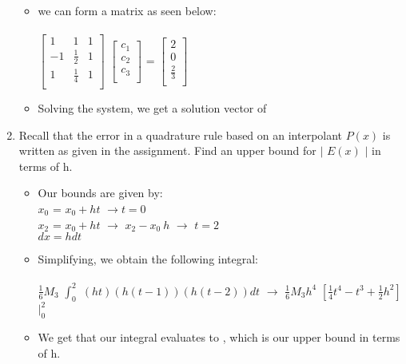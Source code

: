 \documentclass[12pt]{article}
\begin{document}
\begin{enumerate}
\begin{itemize}
		\item we can form a matrix as seen below: \\ \\
		$\begin{bmatrix}
   			1 & 1 & 1 \\
   			-1 & \frac{1}{2} & 1 \\
   			1 & \frac{1}{4} & 1 \\
		\end{bmatrix}$ 	$\begin{bmatrix}
   			c_1  \\
   			c_2  \\
   			c_3  \\
		\end{bmatrix}$ = $\begin{bmatrix}
   			2  \\
   			0  \\
   			\frac{2}{3}  \\
		\end{bmatrix}$
		
		\item Solving the system, we get a solution vector of \\ 
	\end{itemize}
	
	\item Recall that the error in a quadrature rule based on an interpolant $P(x)$ is written as given in the assignment. Find an upper bound for $|$ $E(x)$ $|$ in terms of h.
	\begin{itemize}
		\item Our bounds are given by: \\
		$x_0$ = $x_0 + ht$ $\rightarrow t=0$ \\
		$x_2$ = $x_0 + ht$ $\rightarrow$ $x_2 - x_0 \ h$ $\rightarrow$ $t = 2$ \\
		$dx = hdt$
		\item Simplifying, we obtain the following integral: \\ \\
		$\frac{1}{6}M_3$ $\int_0^2$ $(ht)(h(t-1))(h(t-2))dt$ $\rightarrow$ $\frac{1}{6}M_3h^4$ $[\frac{1}{4}t^4-t^3+\frac{1}{2}h^2]$ $|_0^2$
		\item We get that our integral evaluates to , which is our upper bound in terms of h. 
	\end{itemize}
	

\end{enumerate}
\end{document}

